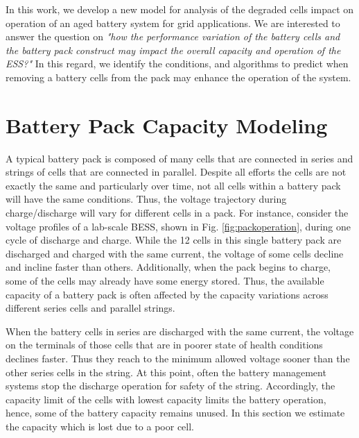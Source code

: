 \documentclass[10pt,twocolumn]{IEEEtran}
\begin{document}
In this work, we develop a new model for analysis of the degraded cells impact  on operation of  an aged battery system for grid applications. We  are interested to answer the question on \emph{"how the performance variation of the battery cells and the battery pack construct may impact the overall capacity and operation of the ESS?"} In this regard, we identify the conditions, and algorithms to predict when removing a battery cells from the pack may enhance the operation of the system.  




\section{Battery Pack Capacity Modeling}

A typical battery pack is composed of many cells that are connected in series and strings of cells that are connected in parallel. 
Despite all efforts the cells are not exactly the same and particularly over time, not all cells within a battery pack will have the same conditions.
Thus, the voltage trajectory during charge/discharge will vary for different cells in a pack.
For instance, consider the voltage profiles of a lab-scale BESS,  shown in Fig. \ref{fig:packoperation}, during one cycle of discharge and charge.
While the 12 cells in this single battery pack are discharged and charged with the same current, the voltage of some cells decline and incline faster than others.
Additionally, when the pack begins to charge, some of the cells may already have some energy stored.
Thus, the available capacity of a battery pack is often affected by the capacity variations  across different  series cells and parallel strings.


When the battery cells in series  are discharged with the same current, the voltage on the terminals of those cells that are in poorer state of health conditions  declines faster.
Thus they reach to the minimum allowed voltage sooner than the other series cells in the  string.
At this point, often the battery management systems stop the discharge operation for safety of the string.
Accordingly, the capacity limit of the cells with lowest capacity limits the battery operation, hence, some of the battery  capacity remains unused.
In this section we estimate the capacity which is lost due to a poor cell.
\end{document}
